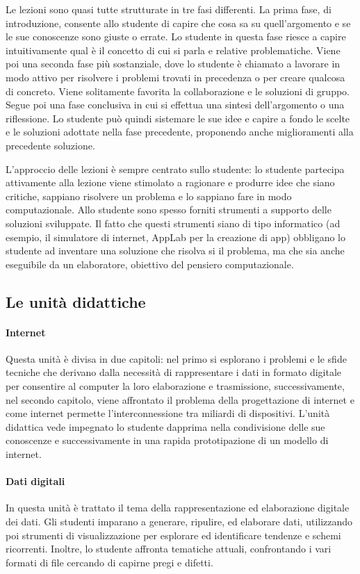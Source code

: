 \documentclass[11pt,a4paper]{article}
\begin{document}
Le lezioni sono quasi tutte strutturate in tre fasi differenti. La
prima fase, di introduzione, consente allo studente di capire che cosa
sa su quell'argomento e se le sue conoscenze sono giuste o errate. Lo
studente in questa fase riesce a capire intuitivamente qual è il
concetto di cui si parla e relative problematiche. Viene poi una
seconda fase più sostanziale, dove lo studente è chiamato a lavorare
in modo attivo per risolvere i problemi trovati in precedenza o per
creare qualcosa di concreto. Viene solitamente favorita la
collaborazione e le soluzioni di gruppo. Segue poi una fase conclusiva
in cui si effettua una sintesi dell'argomento o una riflessione. Lo
studente può quindi sistemare le sue idee e capire a fondo le scelte e
le soluzioni adottate nella fase precedente, proponendo anche
miglioramenti alla precedente soluzione.

L'approccio delle lezioni è sempre centrato sullo studente: lo
studente partecipa attivamente alla lezione viene stimolato a
ragionare e produrre idee che siano critiche, sappiano risolvere un
problema e lo sappiano fare in modo computazionale. Allo studente sono
spesso forniti strumenti a supporto delle soluzioni sviluppate. Il
fatto che questi strumenti siano di tipo informatico (ad esempio, il
simulatore di internet, AppLab per la creazione di app) obbligano lo
studente ad inventare una soluzione che risolva si il problema, ma che
sia anche eseguibile da un elaboratore, obiettivo del pensiero
computazionale.

\subsection{Le unità didattiche}

\paragraph{Internet}
Questa unità è divisa in due capitoli: nel primo si esplorano i
problemi e le sfide tecniche che derivano dalla necessità di
rappresentare i dati in formato digitale per consentire al computer la
loro elaborazione e trasmissione, successivamente, nel secondo
capitolo, viene affrontato il problema della progettazione di internet
e come internet permette l'interconnessione tra miliardi di
dispositivi. L'unità didattica vede impegnato lo studente dapprima
nella condivisione delle sue conoscenze e successivamente in una
rapida prototipazione di un modello di internet.

\paragraph{Dati digitali}
In questa unità è trattato il tema della rappresentazione ed
elaborazione digitale dei dati. Gli studenti imparano a generare,
ripulire, ed elaborare dati, utilizzando poi strumenti di
visualizzazione per esplorare ed identificare tendenze e schemi
ricorrenti. Inoltre, lo studente affronta tematiche attuali,
confrontando i vari formati di file cercando di capirne pregi e
difetti.
\end{document}
